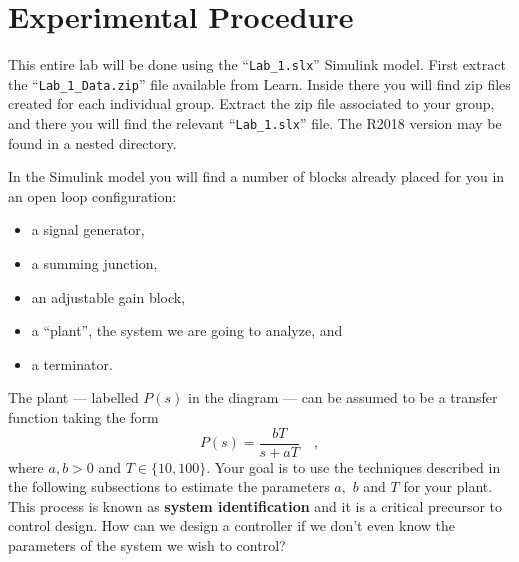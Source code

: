 \section{Experimental Procedure}
This entire lab will be done using the ``\texttt{Lab\_1.slx}'' Simulink model.
First extract the ``\texttt{Lab\_1\_Data.zip}'' file available from Learn.
Inside there you will find zip files created for each individual group. Extract
the zip file associated to your group, and there you will find the relevant
``\texttt{Lab\_1.slx}'' file. The R2018 version may be found in a nested
directory.

In the Simulink model you will
find a number of blocks already placed for you in an open loop configuration:
\begin{itemize}
  \item{a signal generator,}
  \item{a summing junction,}
  \item{an adjustable gain block,}
  \item{a ``plant'', the system we are going to analyze, and}
  \item{a terminator.}
\end{itemize}
%
The plant --- labelled \(P(s)\) in the diagram --- can be assumed to be a
transfer function taking the form
\[
  P(s) = \frac{b T}{s + a T} \quad ,
\]
where \(a, b > 0\) and \(T \in \{10, 100\}.\) Your goal is to use the
techniques described in the following subsections to estimate the parameters
\(a,\) \(b\) and \(T\) for your plant. This process is known as
\textbf{system identification} and it is a critical precursor to control
design. How can we design a controller if we don't even know the parameters
of the system we wish to control?

